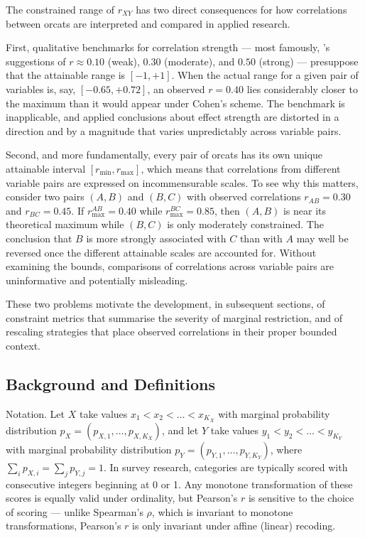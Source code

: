 \documentclass[
  12pt,
]{article}
\theoremstyle{plain}
\theoremstyle{definition}
\theoremstyle{remark}
\begin{document}
The constrained range of \(r_{XY}\) has two direct consequences for how
correlations between orcats are interpreted and compared in applied
research.

First, qualitative benchmarks for correlation strength --- most
famously, \textcite{cohe02-applied}'s suggestions of \(r \approx 0.10\)
(weak), \(0.30\) (moderate), and \(0.50\) (strong) --- presuppose that
the attainable range is \([-1, +1]\). When the actual range for a given
pair of variables is, say, \([-0.65, +0.72]\), an observed \(r = 0.40\)
lies considerably closer to the maximum than it would appear under
Cohen's scheme. The benchmark is inapplicable, and applied conclusions
about effect strength are distorted in a direction and by a magnitude
that varies unpredictably across variable pairs.

Second, and more fundamentally, every pair of orcats has its own unique
attainable interval \([r_{\min}, r_{\max}]\), which means that
correlations from different variable pairs are expressed on
incommensurable scales. To see why this matters, consider two pairs
\((A,B)\) and \((B,C)\) with observed correlations \(r_{AB} = 0.30\) and
\(r_{BC} = 0.45\). If \(r_{\max}^{AB} = 0.40\) while
\(r_{\max}^{BC} = 0.85\), then \((A,B)\) is near its theoretical maximum
while \((B,C)\) is only moderately constrained. The conclusion that
\(B\) is more strongly associated with \(C\) than with \(A\) may well be
reversed once the different attainable scales are accounted for. Without
examining the bounds, comparisons of correlations across variable pairs
are uninformative and potentially misleading.

These two problems motivate the development, in subsequent sections, of
constraint metrics that summarise the severity of marginal restriction,
and of rescaling strategies that place observed correlations in their
proper bounded context.

\subsection{Background and
Definitions}\label{background-and-definitions}

Notation. Let \(X\) take values \(x_1 < x_2 < \dots < x_{K_X}\) with
marginal probability distribution \(p_X = (p_{X,1}, \dots, p_{X,K_X})\),
and let \(Y\) take values \(y_1 < y_2 < \dots < y_{K_Y}\) with marginal
probability distribution \(p_Y = (p_{Y,1}, \dots, p_{Y,K_Y})\), where
\(\sum_i p_{X,i} = \sum_j p_{Y,j} = 1\). In survey research, categories
are typically scored with consecutive integers beginning at 0 or 1. Any
monotone transformation of these scores is equally valid under
ordinality, but Pearson's \(r\) is sensitive to the choice of scoring
--- unlike Spearman's \(\rho\), which is invariant to monotone
transformations, Pearson's \(r\) is only invariant under affine (linear)
recoding.
\end{document}

